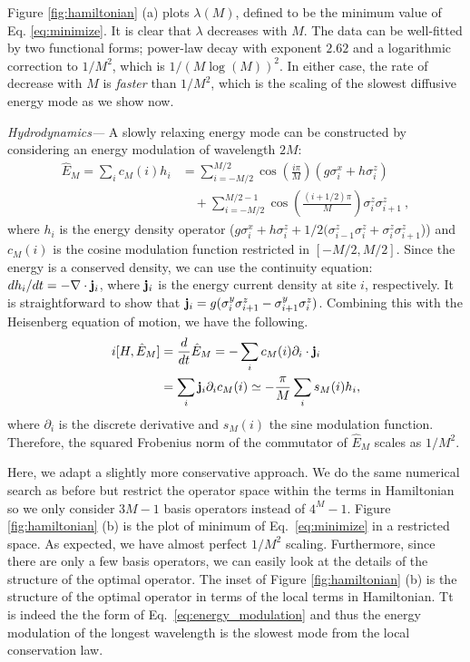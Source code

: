 \documentclass[twocolumn,superscriptaddress, prb]{revtex4-1}
\begin{document}
Figure \ref{fig:hamiltonian} (a) plots $\lambda (M)$, defined to be the minimum value of Eq. \eqref{eq:minimize}.
It is clear that $\lambda$ decreases with $M$.
The data can be well-fitted by two functional forms; power-law decay with exponent $2.62$ and a logarithmic correction to $1/M^2$, which is $1/(M\log(M))^2$.
In either case, the rate of decrease with $M$ is {\it faster} than $1/M^2$, which is the scaling of the slowest diffusive energy mode as we show now.

{\it Hydrodynamics---}
A slowly relaxing energy mode can be constructed by considering an energy modulation of wavelength $2M$:
\begin{align}
\hat{E}_M = \sum_i c_M(i) h_i
&= \sum_{i=-M/2}^{M/2} \cos\left(\frac{i\pi}{M}\right)(g \sigma^x_i + h\sigma^z_i)\nonumber\\
&\quad+ \sum_{i=-M/2}^{M/2-1} \cos\left(\frac{(i+1/2)\pi}{M}\right)\sigma^z_i\sigma^z_{i+1} ~,
\label{eq:energy_modulation}
\end{align}
where $h_i$ is the energy density operator ($g \sigma^x_i + h\sigma^z_i + 1/2(\sigma^z_{i-1}\sigma^z_i + \sigma^z_i\sigma^z_{i+1}$))
and $c_M(i)$ is the cosine modulation function restricted in $[-M/2,M/2]$.
Since the energy is a conserved density, we can use the continuity equation:
$d h_i/dt = -\nabla \cdot {\bf j}_i$, where ${\bf j}_i$ is the energy current density at site $i$, respectively.
It is straightforward to show that ${\bf j}_i = g(\sigma^y_i \sigma^z_{i+1} - \sigma^y_{i+1} \sigma^z_i)$.
Combining this with the Heisenberg equation of motion, we have the following.
\begin{align}
 i[H,\hat{E}_M] &= \frac{d}{dt} \hat{E}_M = -\sum_i c_M(i) \partial_i \cdot {\bf j}_i \\
 &= \sum_i {\bf j}_i \partial_i c_M(i) \simeq -\frac{\pi}{M} \sum_i s_M(i) h_i,
\end{align}
where $\partial_i$ is the discrete derivative and $s_M(i)$ the sine modulation function.
Therefore, the squared Frobenius norm of the commutator of $\hat{E}_M$ scales as $1/M^2$.

Here, we adapt a slightly more conservative approach.
We do the same numerical search as before but restrict the operator space within the terms in Hamiltonian
so we only consider $3M-1$ basis operators instead of $4^M-1$.
Figure \ref{fig:hamiltonian} (b) is the plot of minimum of Eq.~\eqref{eq:minimize} in a restricted space.
As expected, we have almost perfect $1/M^2$ scaling.
Furthermore, since there are only a few basis operators, we can easily look at the details of the structure of the optimal operator.
The inset of Figure \ref{fig:hamiltonian} (b) is the structure of the optimal operator in terms of the local terms in Hamiltonian.
Tt is indeed the the form of Eq.~\eqref{eq:energy_modulation} and thus the energy modulation of the longest wavelength is the slowest mode
from the local conservation law.
\end{document}
